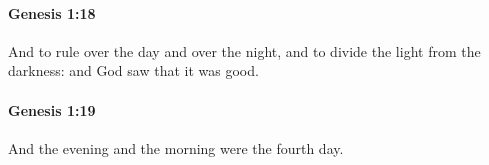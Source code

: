 		\paragraph{Genesis 1:18} %
			\label{GENESIS-1-18}

			And to rule over the day and over the night, and to divide the light from the darkness: and God saw that it was good.


		\paragraph{Genesis 1:19} %
			\label{GENESIS-1-19}

			And the evening and the morning were the fourth day.


